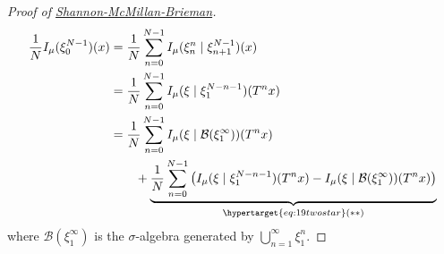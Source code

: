 \documentclass{article}
\begin{document}
\begin{proof}[Proof of \hyperlink{def:smb}{Shannon-McMillan-Brieman}]
  \begin{align*}
    \frac{1}{N} I_\mu(\xi_0^{N-1})(x) &= \frac{1}{N} \sum_{n=0}^{N-1} I_\mu(\xi_n^n \mid \xi_{n+1}^{N-1})(x) \\
                                      &= \frac{1}{N} \sum_{n=0}^{N-1} I_\mu(\xi \mid \xi_1^{N-n-1})(T^n x) \\
                                      &= \frac{1}{N} \sum_{n=0}^{N-1} I_\mu(\xi \mid \mathcal{B}(\xi_1^\infty)) (T^n x) \\
                                      &\qquad+ \underbrace{\frac{1}{N} \sum_{n=0}^{N-1} \left(I_\mu(\xi \mid \xi_1^{N-n-1})(T^n x) - I_\mu(\xi \mid \mathcal{B}(\xi_1^\infty))(T^n x)\right)}_{\hypertarget{eq:19twostar}(**)}
  \end{align*}
  where $\mathcal{B}(\xi_1^\infty)$ is the $\sigma$-algebra generated by $\bigcup_{n=1}^\infty \xi_1^n$.


\end{proof}
\end{document}
